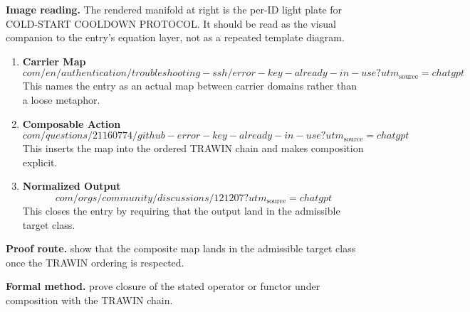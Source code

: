 \begin{samepage}
\noindent\begin{minipage}[t]{0.45\linewidth}
\vspace{0pt}
\raggedright
\scriptsize\textbf{Image reading.} The rendered manifold at right is the per-ID light plate for COLD-START COOLDOWN PROTOCOL. It should be read as the visual companion to the entry's equation layer, not as a repeated template diagram.\par
\end{minipage}\hfill
\begin{minipage}[t]{0.53\linewidth}
\vspace*{-0.10in}
\raggedright
{}
\end{minipage}
\end{samepage}

\clearpage


\begin{enumerate}[leftmargin=1.6em,itemsep=9pt,topsep=6pt]
\item \textbf{Carrier Map}
\[
com/en/authentication/troubleshooting-ssh/error-key-already-in-use?utm_{\mathrm{source}}=chatgpt
\]
This names the entry as an actual map between carrier domains rather than a loose metaphor.

\item \textbf{Composable Action}
\[
com/questions/21160774/github-error-key-already-in-use?utm_{\mathrm{source}}=chatgpt
\]
This inserts the map into the ordered TRAWIN chain and makes composition explicit.

\item \textbf{Normalized Output}
\[
com/orgs/community/discussions/121207?utm_{\mathrm{source}}=chatgpt
\]
This closes the entry by requiring that the output land in the admissible target class.
\end{enumerate}

\textbf{Proof route.} show that the composite map lands in the admissible target class once the TRAWIN ordering is respected.

\textbf{Formal method.} prove closure of the stated operator or functor under composition with the TRAWIN chain.

\medskip
{}

